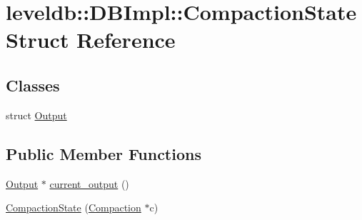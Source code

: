 \hypertarget{structleveldb_1_1_d_b_impl_1_1_compaction_state}{}\section{leveldb\+:\+:D\+B\+Impl\+:\+:Compaction\+State Struct Reference}
\label{structleveldb_1_1_d_b_impl_1_1_compaction_state}
\subsection*{Classes}
\begin{DoxyCompactItemize}
\item 
struct \hyperlink{structleveldb_1_1_d_b_impl_1_1_compaction_state_1_1_output}{Output}
\end{DoxyCompactItemize}
\subsection*{Public Member Functions}
\begin{DoxyCompactItemize}
\item 
\hyperlink{structleveldb_1_1_d_b_impl_1_1_compaction_state_1_1_output}{Output} $\ast$ \hyperlink{structleveldb_1_1_d_b_impl_1_1_compaction_state_ac371d4a1422f4c1c122cfd39e97a6b95}{current\+\_\+output} ()
\item 
\hyperlink{structleveldb_1_1_d_b_impl_1_1_compaction_state_a3f66a31afd7f73ef5021337d1ec626b6}{Compaction\+State} (\hyperlink{classleveldb_1_1_compaction}{Compaction} $\ast$c)
\end{DoxyCompactItemize}
